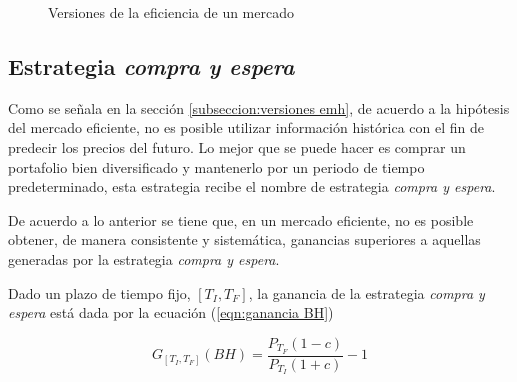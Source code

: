 \documentclass[12pt]{report}
\theoremstyle{break}
\theoremstyle{break}
\begin{document}
\begin{figure}[ht]
\centering
{}
\caption{\label{imagen:versiones emh} Versiones de la eficiencia de un mercado}
\end{figure}


\subsection{Estrategia \textit{compra y espera}}
\label{seccion:buy and hold}
Como se señala en la sección \ref{subseccion:versiones emh}, de acuerdo a la hipótesis del mercado eficiente, no es posible utilizar información histórica con el fin de predecir los precios del futuro. Lo mejor que se puede hacer es comprar un portafolio bien diversificado y mantenerlo por un periodo de tiempo predeterminado, esta estrategia recibe el nombre de estrategia \textit{compra y espera}.

De acuerdo a lo anterior se tiene que, en un mercado eficiente, no es posible obtener, de manera consistente y sistemática, ganancias superiores a aquellas generadas por la estrategia \textit{compra y espera}.

Dado un plazo de tiempo fijo, $\left[T_{I}, T_{F}\right]$, la ganancia de la estrategia \textit{compra y espera} está dada por la ecuación (\ref{eqn:ganancia BH})

\begin{equation} \label{eqn:ganancia BH}
G_{\left[T_{I}, T_{F}\right]} (BH) = \dfrac{P_{T_F} (1 - c) } { P_{T_I} (1 + c) } - 1
\end{equation}
\end{document}
